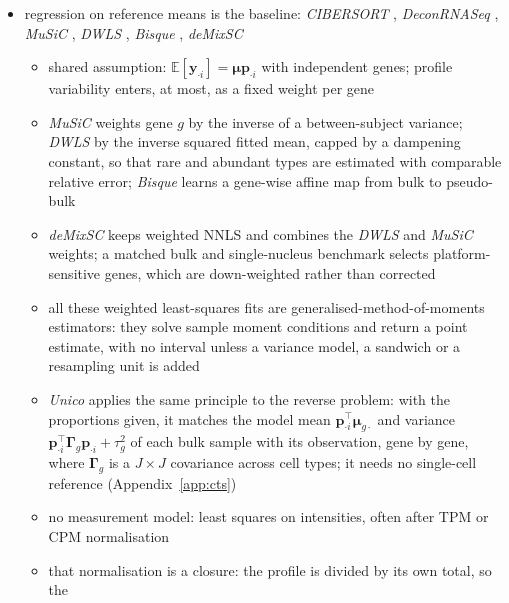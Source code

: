 \documentclass[pdflatex, sn-nature]{sn-jnl}
\theoremstyle{thmstyleone}%
\theoremstyle{thmstyletwo}%
\theoremstyle{thmstylethree}%
\begin{document}
\begin{itemize}
  \item regression on reference means is the baseline:
        \emph{CIBERSORT} \cite{newmanRobustEnumerationCell2015,newmanDeterminingCellType2019},
        \emph{DeconRNASeq} \cite{gongDeconRNASeqStatisticalFramework2013},
        \emph{MuSiC} \cite{wangBulkTissueCell2019},
        \emph{DWLS} \cite{tsoucasAccurateEstimationCelltype2019},
        \emph{Bisque} \cite{jewAccurateEstimationCell2020},
        \emph{deMixSC} \cite{guoDeMixSCDeconvolutionFramework2023}
  \begin{itemize}
    \item shared assumption: \(\mathbb{E}[\boldsymbol{y}_{\cdot i}]=\boldsymbol{\mu}\boldsymbol{p}_{\cdot i}\)
          with independent genes; profile variability enters, at most, as a fixed weight per gene
    \item \emph{MuSiC} weights gene \(g\) by the inverse of a between-subject variance;
          \emph{DWLS} by the inverse squared fitted mean, capped by a dampening constant, so that rare and
          abundant types are estimated with comparable relative error;
          \emph{Bisque} learns a gene-wise affine map from bulk to pseudo-bulk
    \item \emph{deMixSC} keeps weighted NNLS and combines the \emph{DWLS} and \emph{MuSiC} weights; a matched bulk and
          single-nucleus benchmark selects platform-sensitive genes, which are down-weighted rather than corrected
    \item all these weighted least-squares fits are generalised-method-of-moments estimators: they solve sample
          moment conditions and return a point estimate, with no interval unless a variance model, a sandwich or a
          resampling unit is added
    \item \emph{Unico} applies the same principle to the reverse problem: with the proportions given, it matches the
          model mean \(\boldsymbol{p}_{\cdot i}^{\top}\boldsymbol{\mu}_{g\cdot}\) and variance
          \(\boldsymbol{p}_{\cdot i}^{\top}\boldsymbol{\Gamma}_{g}\boldsymbol{p}_{\cdot i}+\tau_{g}^{2}\) of each bulk sample with its observation, gene by gene,
          where \(\boldsymbol{\Gamma}_{g}\) is a \(J\times J\) covariance across cell types; it needs no single-cell reference
          \cite{chenUnicoUnifiedModelCell2025} (Appendix~\ref{app:cts})
    \item no measurement model: least squares on intensities, often after TPM or CPM normalisation
    \item that normalisation is a \gls{closure}: the profile is divided by its own total, so the

\end{itemize}
\end{itemize}
\end{document}
